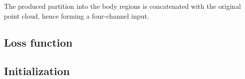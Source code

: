 \noindent The produced partition into the body regions is concatenated with the original point cloud, hence forming a four-channel input. 




\subsection{Loss function}

\subsection{Initialization}

